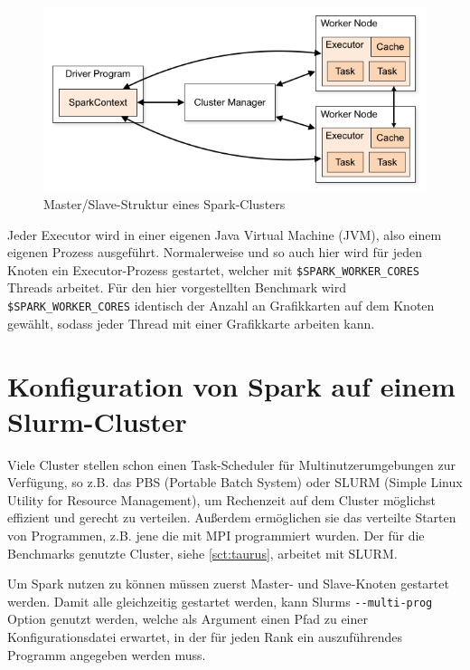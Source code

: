 \begin{figure}
    \centerline{\includegraphics[width=0.8\linewidth]{cluster-overview.png}}
    \caption{Master/Slave-Struktur eines Spark-Clusters\cite{spark}}
    \label{fig:sparkcluster}
\end{figure}

Jeder Executor wird in einer eigenen Java Virtual Machine (JVM), also einem eigenen Prozess ausgeführt. Normalerweise und so auch hier wird für jeden Knoten ein Executor-Prozess gestartet, welcher mit \lstinline!$SPARK_WORKER_CORES! Threads arbeitet. Für den hier vorgestellten Benchmark wird \lstinline!$SPARK_WORKER_CORES! identisch der Anzahl an Grafikkarten auf dem Knoten gewählt, sodass jeder Thread mit einer Grafikkarte arbeiten kann.

\section{Konfiguration von Spark auf einem Slurm-Cluster}

Viele Cluster stellen schon einen Task-Scheduler für Multinutzerumgebungen zur Verfügung, so z.B. das PBS (Portable Batch System) oder SLURM (Simple Linux Utility for Resource Management), um Rechenzeit auf dem Cluster möglichst effizient und gerecht zu verteilen. Außerdem ermöglichen sie das verteilte Starten von Programmen, z.B. jene die mit MPI programmiert wurden. Der für die Benchmarks genutzte Cluster, siehe \autoref{sct:taurus}, arbeitet mit SLURM.

Um Spark nutzen zu können müssen zuerst Master- und Slave-Knoten gestartet werden. Damit alle gleichzeitig gestartet werden, kann Slurms \lstinline!--multi-prog! Option genutzt werden, welche als Argument einen Pfad zu einer Konfigurationsdatei erwartet, in der für jeden Rank ein auszuführendes Programm angegeben werden muss.

